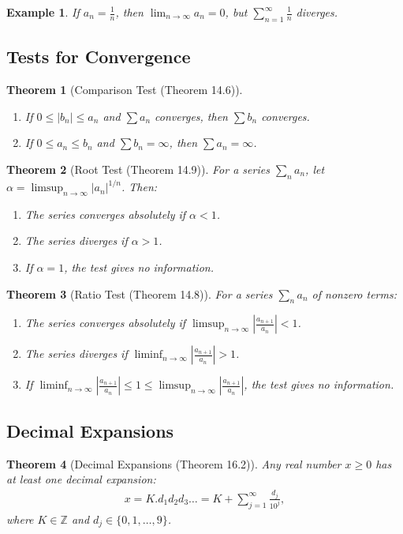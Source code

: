 \documentclass[9pt]{article}
\theoremstyle{definition}
\theoremstyle{plain}
\newtheorem{theorem}{Theorem}
\newtheorem{example}{Example}
\begin{document}
\begin{example}
If $ a_n = \frac{1}{n} $, then $ \lim_{n \to \infty} a_n = 0 $, but $ \sum_{n=1}^\infty \frac{1}{n} $ diverges.
\end{example}

\subsection*{Tests for Convergence}
\begin{theorem}[Comparison Test (Theorem 14.6)]

\begin{enumerate}
    \item If $ 0 \leq |b_n| \leq a_n $ and $ \sum a_n $ converges, then $ \sum b_n $ converges.
    \item If $ 0 \leq a_n \leq b_n $ and $ \sum b_n = \infty $, then $ \sum a_n = \infty $.
\end{enumerate}
\end{theorem}

\begin{theorem}[Root Test (Theorem 14.9)]
For a series $ \sum_n a_n $, let $ \alpha = \limsup_{n \to \infty} |a_n|^{1/n} $. Then:
\begin{enumerate}
    \item The series converges absolutely if $ \alpha < 1 $.
    \item The series diverges if $ \alpha > 1 $.
    \item If $ \alpha = 1 $, the test gives no information.
\end{enumerate}
\end{theorem}

\begin{theorem}[Ratio Test (Theorem 14.8)]
For a series $ \sum_n a_n $ of nonzero terms:
\begin{enumerate}
    \item The series converges absolutely if $ \limsup_{n \to \infty} \left|\frac{a_{n+1}}{a_n}\right| < 1 $.
    \item The series diverges if $ \liminf_{n \to \infty} \left|\frac{a_{n+1}}{a_n}\right| > 1 $.
    \item If $ \liminf_{n \to \infty} \left|\frac{a_{n+1}}{a_n}\right| \leq 1 \leq \limsup_{n \to \infty} \left|\frac{a_{n+1}}{a_n}\right| $, the test gives no information.
\end{enumerate}
\end{theorem}

\subsection*{Decimal Expansions}
\begin{theorem}[Decimal Expansions (Theorem 16.2)]
Any real number $ x \geq 0 $ has at least one decimal expansion:
\begin{align}
x = K.d_1d_2d_3\ldots = K + \sum_{j=1}^\infty \frac{d_j}{10^j},
\end{align}
where $ K \in \mathbb{Z} $ and $ d_j \in \{0, 1, \ldots, 9\} $.
\end{theorem}
\end{document}
